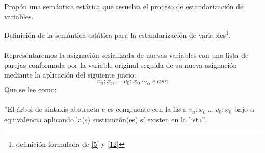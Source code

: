         \begin{exercise} 
	Propón una semántica estática que resuelva el proceso de estandarización de variables.
    \end{exercise}
	\begin{definition} Definición de la semántica estática para la estandarización de variables\footnote{definición formulada de \hyperlink{5}{[5]} y  \hyperlink{12}{[12]}}.\\\\
	Representaremos la asignación serializada de nuevas variables con una lista de parejas conformada por la variable original seguida de su nueva asignación mediante la aplicación del siguiente juicio: $$v_n:x_n\ ...\ v_0:x_0\ \sim_{\alpha}\ e\ asa$$ 
          Que se lee como: \\\\
	''El árbol de sintaxis abstracta $e$ es congruente con la lista $v_n: x_n\ ...\ v_0:x_0$ bajo $\alpha$-equivalencia aplicando la(s) sustitución(es) sí existen en la lista''.\\


\end{definition}
